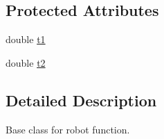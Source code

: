 \subsection*{Protected Attributes}
\begin{DoxyCompactItemize}
\item 
double \hyperlink{classrob_function_a9a4b408a3a5a8ae927caec3b6bac36ef}{t1}
\item 
double \hyperlink{classrob_function_abf15c2d695ab4cc6336e19862327858f}{t2}
\end{DoxyCompactItemize}


\subsection{Detailed Description}
Base class for robot function. 

